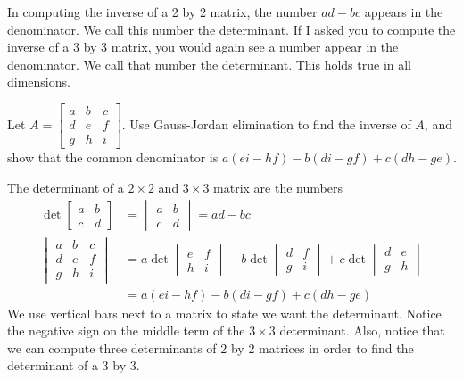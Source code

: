 \mysubsection{\ideadet}
In computing the inverse of a 2 by 2 matrix, the number $ad-bc$ appears in the denominator. We call this number the determinant. 
% 
If I asked you to compute the inverse of a 3 by 3 matrix, you would again see a number appear in the denominator.  We call that number the determinant. This holds true in all dimensions.

\begin{problem*}[Optional]
  Let $A=\begin{bmatrix}a&b&c\\d&e&f\\g&h&i\end{bmatrix}$. Use Gauss-Jordan elimination to find the inverse of $A$, and show that the common denominator is $a(ei-hf)-b(di-gf)+c(dh-ge)$. 
\end{problem*}


\begin{definition}\label{determinat of 2 by 2 and 3 by 3}
 The determinant of a {$2\times 2$} and {$3\times 3$} matrix are the numbers 
\begin{align*}
\det\begin{bmatrix}a&b\\c&d\end{bmatrix} &=\begin{vmatrix}a&b\\c&d\end{vmatrix} = ad-bc\\
\begin{vmatrix}a&b&c\\d&e&f\\g&h&i\end{vmatrix} &= a\det\begin{vmatrix}e&f\\h&i\end{vmatrix} -b\det\begin{vmatrix}d&f\\g&i\end{vmatrix} +c\det\begin{vmatrix}d&e\\g&h\end{vmatrix}\\
&=a(ei-hf)-b(di-gf)+c(dh-ge)
\end{align*}
% 
We use vertical bars next to a matrix to state we want the determinant. Notice the negative sign on the middle term of the {$3 \times 3$} determinant. 
Also, notice that we can compute three determinants of 2 by 2 matrices in order to find the determinant of a 3 by 3. 
\end{definition}










